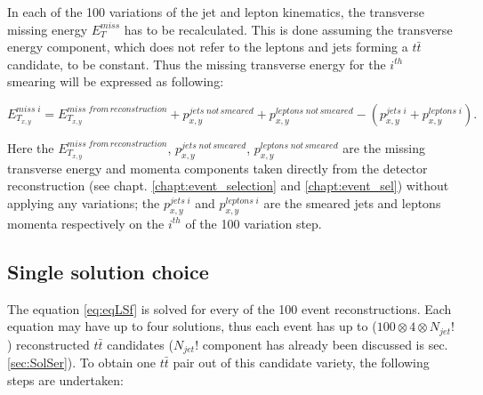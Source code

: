 In each of the 100 variations of the jet and lepton kinematics, the transverse missing energy $E_{T}^{miss}$ has to be recalculated. This is done
assuming the transverse energy component, which does not refer to the leptons and jets forming a $t\bar{t}$ candidate, to be constant. Thus the
missing transverse energy for the $i^{th}$ smearing will be expressed as following:

\begin{equation}
 E^{miss\;i}_{T_{x,y}} = E^{miss \; from \, reconstruction}_{T_{x,y}} + p^{jets \; not\,smeared}_{x,y} + p^{leptons\;not\,smeared}_{x,y} - (p^{jets\;i}_{x,y} + p^{leptons\;i}_{x,y}).
\end{equation}

Here the $E^{miss \; from \, reconstruction}_{T_{x,y}}$, $p^{jets \; not\,smeared}_{x,y}$, $p^{leptons\;not\,smeared}_{x,y}$ are the missing transverse energy and momenta
components taken directly from the detector reconstruction (see chapt. \ref{chapt:event_selection} and \ref{chapt:event_sel}) without applying any variations; the $p^{jets\;i}_{x,y}$ and $p^{leptons\;i}_{x,y}$
are the smeared jets and leptons momenta respectively on the $i^{th}$ of the 100 variation step.

\subsection{Single solution choice}

The equation \ref{eq:eqLSf} is solved for every of the 100 event reconstructions. Each equation may have up to four solutions, thus each event
has up to ($100 \otimes 4 \otimes N_{jet}!$) reconstructed $t\bar{t}$ candidates ($N_{jet}!$ component has already been discussed is sec. \ref{sec:SolSer}). 
To obtain one $t\bar{t}$ pair out of this candidate variety, the following steps are undertaken:


